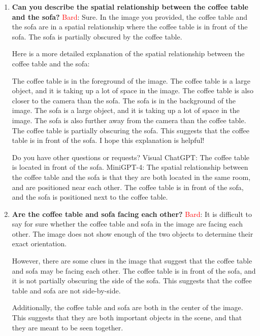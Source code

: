 \begin{enumerate}
    \item \textbf{Can you describe the spatial relationship between the coffee table and the sofa?}
    \subitem \textcolor{Red}{Bard}: 
    Sure. In the image you provided, the coffee table and the sofa are in a spatial relationship where the coffee table is in front of the sofa. The sofa is partially obscured by the coffee table.
    
    Here is a more detailed explanation of the spatial relationship between the coffee table and the sofa:
    
    The coffee table is in the foreground of the image. The coffee table is a large object, and it is taking up a lot of space in the image. The coffee table is also closer to the camera than the sofa.
    The sofa is in the background of the image. The sofa is a large object, and it is taking up a lot of space in the image. The sofa is also further away from the camera than the coffee table.
    The coffee table is partially obscuring the sofa. This suggests that the coffee table is in front of the sofa.
    I hope this explanation is helpful!
    
    Do you have other questions or requests?
    \subitem Visual ChatGPT: The coffee table is located in front of the sofa.
    \subitem MiniGPT-4: The spatial relationship between the coffee table and the sofa is that they are both located in the same room, and are positioned near each other. The coffee table is in front of the sofa, and the sofa is positioned next to the coffee table.
    \item \textbf{Are the coffee table and sofa facing each other?}
    \subitem \textcolor{Red}{Bard}: 
    It is difficult to say for sure whether the coffee table and sofa in the image are facing each other. The image does not show enough of the two objects to determine their exact orientation.
    
    However, there are some clues in the image that suggest that the coffee table and sofa may be facing each other. The coffee table is in front of the sofa, and it is not partially obscuring the side of the sofa. This suggests that the coffee table and sofa are not side-by-side.
    
    Additionally, the coffee table and sofa are both in the center of the image. This suggests that they are both important objects in the scene, and that they are meant to be seen together.
    

\end{enumerate}
